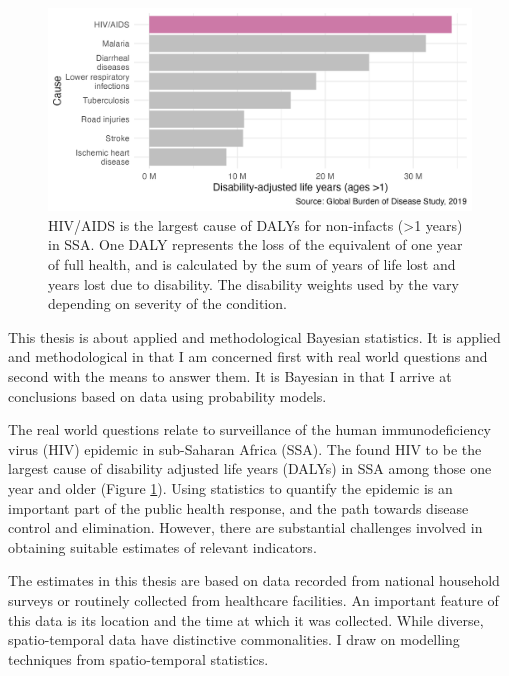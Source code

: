 \documentclass[a4paper, nobind]{templates/ociamthesis}
\begin{document}
\begin{figure}

{\centering \includegraphics[width=0.95\linewidth]{figures/introduction/gbd} 

}

\caption{HIV/AIDS is the largest cause of DALYs for non-infacts (\textgreater1 years) in SSA. One DALY represents the loss of the equivalent of one year of full health, and is calculated by the sum of years of life lost and years lost due to disability. The disability weights used by the \textcite{ihme2019} vary depending on severity of the condition.}\label{fig:gbd}
\end{figure}

This thesis is about applied and methodological Bayesian statistics.
It is applied and methodological in that I am concerned first with real world questions and second with the means to answer them.
It is Bayesian in that I arrive at conclusions based on data using probability models.

The real world questions relate to surveillance of the human immunodeficiency virus (HIV) epidemic in sub-Saharan Africa (SSA).
The \textcite{ihme2019} found HIV to be the largest cause of disability adjusted life years (DALYs) in SSA among those one year and older (Figure \ref{fig:gbd}).
Using statistics to quantify the epidemic is an important part of the public health response, and the path towards disease control and elimination.
However, there are substantial challenges involved in obtaining suitable estimates of relevant indicators.

The estimates in this thesis are based on data recorded from national household surveys or routinely collected from healthcare facilities.
An important feature of this data is its location and the time at which it was collected.
While diverse, spatio-temporal data have distinctive commonalities.
I draw on modelling techniques from spatio-temporal statistics.
\end{document}

